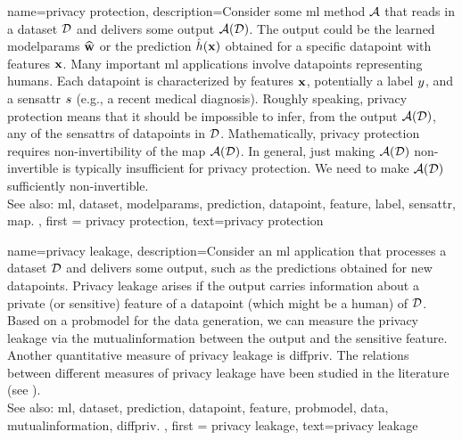 {name={privacy protection},
     description={Consider some \gls{ml} method $\mathcal{A}$ that reads 
	 in a \gls{dataset} $\mathcal{D}$ and delivers some output $\mathcal{A}(\mathcal{D})$. The output 
	 could be the learned \gls{modelparams} $\widehat{{\bf w}}$ or the \gls{prediction} 
	 $\hat{h}({\bf x})$ obtained for a specific \gls{datapoint} with \glspl{feature} 
	 ${\bf x}$. Many important \gls{ml} applications involve \glspl{datapoint} 
		representing humans. Each \gls{datapoint} is characterized by \glspl{feature} ${\bf x}$, 
		potentially a \gls{label} $y$, and a \gls{sensattr} $s$ (e.g., a recent medical diagnosis). 
		Roughly speaking, privacy protection means that it should be impossible to infer, from the output $\mathcal{A}(\mathcal{D})$, 
		any of the \glspl{sensattr} of \glspl{datapoint} in $\mathcal{D}$. Mathematically, privacy protection requires non-invertibility 
		of the \gls{map} $\mathcal{A}(\mathcal{D})$. In general, just making $\mathcal{A}(\mathcal{D})$ non-invertible 
		is typically insufficient for privacy protection. We need to make $\mathcal{A}(\mathcal{D})$ sufficiently non-invertible. 
					\\ 
		See also: \gls{ml}, \gls{dataset}, \gls{modelparams}, \gls{prediction}, \gls{datapoint}, \gls{feature}, \gls{label}, \gls{sensattr}, \gls{map}.
	}, 
	first = {privacy protection}, text={privacy protection} 
}

{
	name={privacy leakage},
	description={Consider an \gls{ml} application that processes a 
	\gls{dataset} $\mathcal{D}$ and delivers some output, such as the \glspl{prediction} 
	obtained for new \glspl{datapoint}. Privacy leakage arises 
	if the output carries information about a private (or sensitive) \gls{feature} of 
	a \gls{datapoint} (which might be a human) of $\mathcal{D}$. Based on a \gls{probmodel} 
	for the \gls{data} generation, we can measure the privacy leakage via the \gls{mutualinformation} 
	between the output and the sensitive \gls{feature}. Another quantitative measure of privacy leakage 
	is \gls{diffpriv}. The relations between different measures of privacy leakage have been 
	studied in the literature (see \cite{InfThDiffPriv}). 
				\\ 
		See also: \gls{ml}, \gls{dataset}, \gls{prediction}, \gls{datapoint}, \gls{feature}, \gls{probmodel}, \gls{data}, \gls{mutualinformation}, \gls{diffpriv}. 
	}, 
	first = {privacy leakage}, text={privacy leakage} 
}



